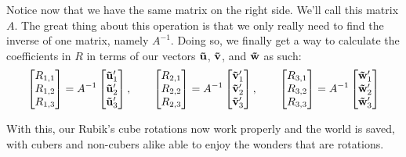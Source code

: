 
Notice now that we have the same matrix on the right side. We'll call this
matrix \( A \). The great thing about this operation is that we only really
need to find the inverse of one matrix, namely \( A^{-1} \). Doing so, we
finally get a way to calculate the coefficients in \( R \) in terms of our vectors \( \bvec{u} \), \( \bvec{v} \), and \( \bvec{w} \) as such:
\[
    \pointsub{R}{1} = A^{-1} \point{\bvec{u}'}, \qquad \pointsub{R}{2} = A^{-1} \point{\bvec{v}'}, \qquad \pointsub{R}{3} = A^{-1} \point{\bvec{w}'} 
\]
\endgroup

With this, our Rubik's cube rotations now work properly  and the world is saved,
with cubers and non-cubers alike able to enjoy the wonders that are rotations.
